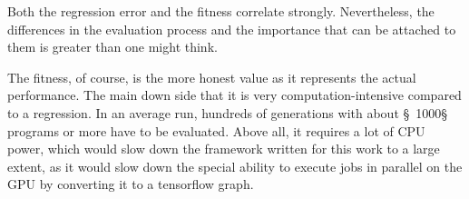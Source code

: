 Both the regression error and the fitness correlate strongly. Nevertheless, the differences in the evaluation process and the importance that can be attached to them is greater than one might think.

The fitness, of course, is the more honest value as it represents the actual performance. The main down side that it is very computation-intensive compared to a regression. In an average run, hundreds of generations with about §~1000§ programs or more have to be evaluated. Above all, it requires a lot of CPU power, which would slow down the framework written for this work to a large extent, as it would slow down the special ability to execute jobs in parallel on the GPU by converting it to a tensorflow graph.


